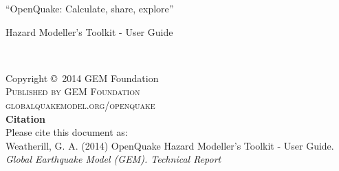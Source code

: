 \documentclass[11pt,fleqn]{book} %
\begin{document}
\lstset{language=Python} %
%


\begingroup
\thispagestyle{empty}
\par\normalfont\fontsize{15}{15}\sffamily\selectfont
“OpenQuake: Calculate, share, explore”
\centering
\vspace*{9cm}
\par\normalfont\fontsize{35}{35}\sffamily\selectfont
Hazard Modeller's Toolkit - User Guide\par %
\endgroup


\newpage
~\vfill
\thispagestyle{empty}

\noindent Copyright \copyright\ 2014 GEM Foundation\\ %

\noindent \textsc{Published by GEM Foundation}\\ %

\noindent \textsc{globalquakemodel.org/openquake}\\ %

\noindent 
   {\textbf{Citation}} \hfill \\
   Please cite this document as:\\
   Weatherill, G. A. (2014) OpenQuake Hazard Modeller's Toolkit - User Guide. \textit{Global Earthquake Model (GEM). Technical Report}\\
   
\end{document}
